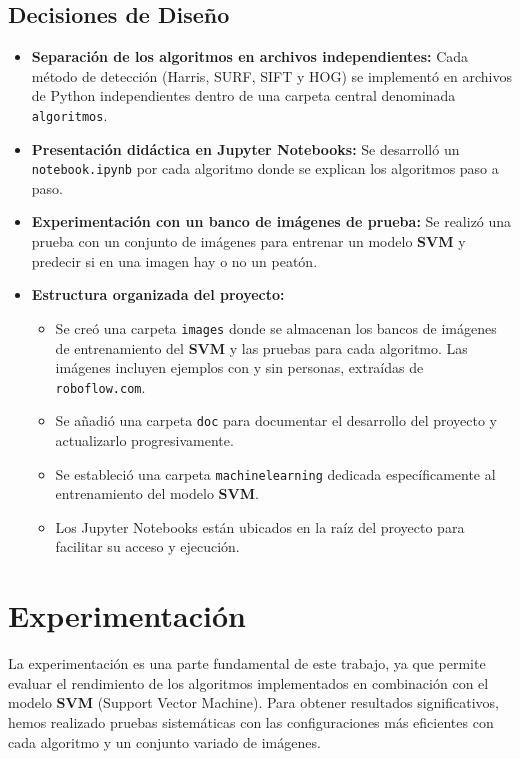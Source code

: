 \documentclass[a4paper]{article}
\begin{document}
\subsection{Decisiones de Diseño}

\begin{itemize}
\item \textbf{Separación de los algoritmos en archivos independientes:} Cada método de detección (Harris, SURF, SIFT y HOG) se implementó en archivos de Python independientes dentro de una carpeta central denominada \texttt{algoritmos}.
\item \textbf{Presentación didáctica en Jupyter Notebooks:} Se desarrolló un \texttt{notebook.ipynb} por cada algoritmo donde se explican los algoritmos paso a paso.
\item \textbf{Experimentación con un banco de imágenes de prueba:} Se realizó una prueba con un conjunto de imágenes para entrenar un modelo \textbf{SVM} y predecir si en una imagen hay o no un peatón.
\item \textbf{Estructura organizada del proyecto:}  
    \begin{itemize}
        \item Se creó una carpeta \texttt{images} donde se almacenan los bancos de imágenes de entrenamiento del \textbf{SVM} y las pruebas para cada algoritmo. Las imágenes incluyen ejemplos con y sin personas, extraídas de \texttt{roboflow.com}.
        \item Se añadió una carpeta \texttt{doc} para documentar el desarrollo del proyecto y actualizarlo progresivamente.
        \item Se estableció una carpeta \texttt{machinelearning} dedicada específicamente al entrenamiento del modelo \textbf{SVM}.
        \item Los Jupyter Notebooks están ubicados en la raíz del proyecto para facilitar su acceso y ejecución.
    \end{itemize}
\end{itemize}

\newpage

\section{Experimentación}

La experimentación es una parte fundamental de este trabajo, ya que permite evaluar el rendimiento de los algoritmos implementados en combinación con el modelo \textbf{SVM} (Support Vector Machine). 
Para obtener resultados significativos, hemos realizado pruebas sistemáticas con las configuraciones más eficientes con cada algoritmo y un conjunto variado de imágenes.
\par \hspace{1cm}
\end{document}
